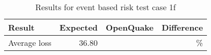 \begin{table}[htbp]

\centering
\begin{tabular}{ l r r r }

\hline
\rowcolor{anti-flashwhite}
\bf{Result} & \bf{Expected} & \bf{OpenQuake} & \bf{Difference}\\
\hline
Average loss & 36.80 &  & \% \\
\hline
\end{tabular}

\caption{Results for event based risk test case 1f}
\label{tab:result-ebr-1f}
\end{table}